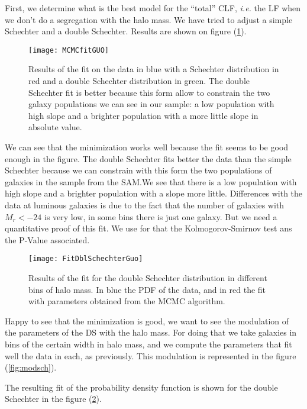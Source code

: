 First, we determine what is the best model for the ``total'' CLF, \textit{i.e.} the LF when we don't do a segregation with the halo
mass. We have tried to adjust a simple Schechter and a double Schechter. Results are shown on figure (\ref{fig:fitguo}).
\begin{figure}[ht]
    \centering
    \texttt{[image: MCMCfitGUO]}
    \caption{\footnotesize{}Results of the fit on the data in blue with a Schechter distribution in red and a double Schechter
    distribution in green. The double Schechter fit is better because this form allow to constrain the two galaxy populations we
    can see in our sample: a low population with high slope and a brighter population with a more little slope in absolute
    value.}
\label{fig:fitguo}
\end{figure}
We can see that the minimization works well because the fit seems to be good enough in the figure. The double Schechter fits better
the data than the simple Schechter because we can constrain with this form the two populations of galaxies in the sample from the
\citet{Guo+11} SAM.\@ We see that there is a low population with high slope and a brighter population with a slope more little.
Differences with the data at luminous galaxies is due to the fact that the number of galaxies with $M_r<-24$ is very low, in some
bins there is just one galaxy. But we need a quantitative proof of this fit. We use for that the Kolmogorov-Smirnov test ans the
P-Value associated.
\begin{figure}[ht]
    \centering
    \texttt{[image: FitDblSchechterGuo]}
    \caption{\footnotesize{}Results of the fit for the double Schechter distribution in different bins of halo mass. In blue the
    PDF of the data, and in red the fit with parameters obtained from the MCMC algorithm.}
\label{fig:fitguodblsch}
\end{figure}

Happy to see that the minimization is good, we want to see the modulation of the parameters of the DS with the halo mass. For doing
that we take galaxies in bins of the certain width in halo mass, and we compute the parameters that fit well the data in each, as
previously. This modulation is represented in the figure (\ref{fig:modsch}).
\begin{figure*}[p]
    \centering
    \begin{minipage}{\linewidth}
    \centering
    \end{minipage}
    \begin{minipage}{\linewidth}
    \centering
    \end{minipage}
    \caption{\footnotesize{}Modulation of the parameters of both Schechter and double Schechter luminosity distributions with
    the halo mass.}
\label{fig:modsch}
\end{figure*}
The resulting fit of the probability density function is shown for the double Schechter in the figure (\ref{fig:fitguodblsch}).

